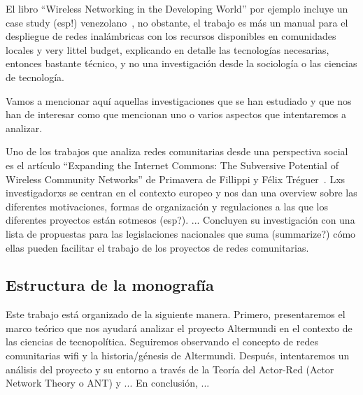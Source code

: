 El libro ``Wireless Networking in the Developing World'' por ejemplo incluye un case study (esp!) venezolano~\autocite[437-452]{WNDW2013}, no obstante, el trabajo es más un manual para el despliegue de redes inalámbricas con los recursos disponibles en comunidades locales y very littel budget, explicando en detalle las tecnologías necesarias, entonces bastante técnico, y no una investigación desde la sociología o las ciencias de tecnología.

Vamos a mencionar aquí aquellas investigaciones que se han estudiado y que nos han de interesar como que mencionan uno o varios aspectos que intentaremos a analizar.

Uno de los trabajos que analiza redes comunitarias desde una perspectiva social es el artículo ``Expanding the Internet Commons: The Subversive Potential of Wireless Community Networks'' de Primavera de Fillippi y Félix Tréguer~\autocite{FiTre2015}.
Lxs investigadorxs se centran en el contexto europeo y nos dan una overview sobre las diferentes motivaciones, formas de organización y regulaciones a las que los diferentes proyectos están sotmesos (esp?).
...
Concluyen su investigación con una lista de propuestas para las legislaciones nacionales que suma (summarize?) cómo ellas pueden facilitar el trabajo de los proyectos de redes comunitarias.


\subsection{Estructura de la monografía}

Este trabajo está organizado de la siguiente manera.
Primero, presentaremos el marco teórico que nos ayudará analizar el proyecto Altermundi en el contexto de las ciencias de tecnopolítica.
Seguiremos observando el concepto de redes comunitarias wifi y la historia/génesis de Altermundi.
Después, intentaremos un análisis del proyecto y su entorno a través de la Teoría del Actor-Red (Actor Network Theory o ANT) y ...
En conclusión, ...

